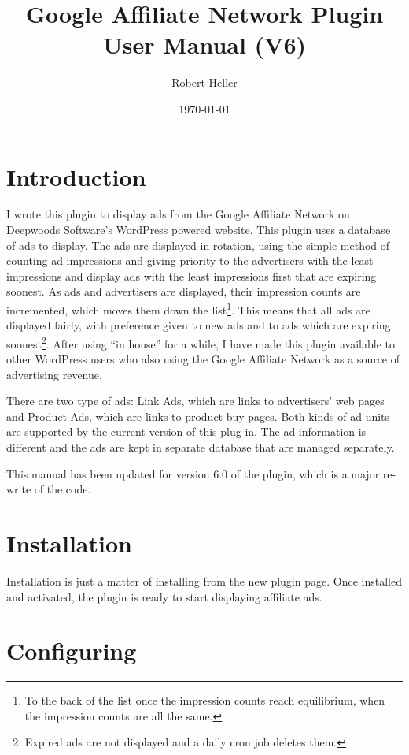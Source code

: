 \documentclass[letterpaper]{article}
\title{Google Affiliate Network Plugin User Manual (V6)}
\author{Robert Heller}
\date{\today}
\begin{document}
\maketitle

\tableofcontents

\section{Introduction}

I wrote this plugin to display ads from the Google Affiliate Network on
Deepwoods Software's WordPress powered website. This plugin uses a
database of ads to display.  The ads are displayed in rotation, using
the simple method of counting ad impressions and giving priority to the
advertisers with the least impressions and display ads with the least
impressions first that are expiring soonest.  As ads and advertisers
are displayed, their impression counts are incremented, which moves
them down the list\footnote{To the back of the list once the impression
counts reach equilibrium, when the impression counts are all the
same.}.  This means that all ads are displayed fairly, with preference
given to new ads and to ads which are expiring soonest\footnote{Expired
ads are not displayed and a daily cron job deletes them.}. After using
``in house'' for a while, I have made this plugin available to other
WordPress users who also using the Google Affiliate Network as a source
of advertising revenue.

There are two type of ads: Link Ads, which are links to advertisers' web
pages and Product Ads, which are links to product buy pages.  Both kinds
of ad units are supported by the current version of this plug in.  The
ad information is different and the ads are kept in separate database
that are managed separately.

This manual has been updated for version 6.0 of the plugin, which is a
major re-write of the code.

\section{Installation}

Installation is just a matter of installing from the new plugin
page.  Once installed and activated, the plugin is ready to start
displaying affiliate ads.

\section{Configuring}
\end{document}

